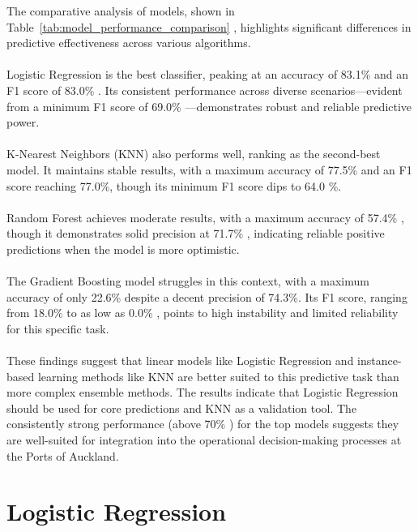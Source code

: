 			The comparative analysis of models, shown in Table~\ref{tab:model_performance_comparison}
			, highlights significant differences in predictive effectiveness across various algorithms.
			\\
			\\
			Logistic Regression is the best classifier, peaking at an accuracy of 83.1\% and an F1 score of 83.0\%
			. Its consistent performance across diverse scenarios—evident from a minimum F1 score of 69.0\%
			—demonstrates robust and reliable predictive power.
			\\
			\\
			K-Nearest Neighbors (KNN) also performs well, ranking as the second-best model. It maintains stable
			results,
			with a maximum accuracy of 77.5\% and an F1 score reaching 77.0\%, though its minimum F1 score dips to 64.0
			\%.
			\\
			\\
			Random Forest achieves moderate results, with a maximum accuracy of 57.4\%
			, though it demonstrates solid precision at 71.7\%
			, indicating reliable positive predictions when the model is more optimistic.
			\\
			\\
			The Gradient Boosting model struggles in this context, with a maximum accuracy of only 22.6\%
			despite a decent precision of 74.3\%. Its F1 score, ranging from 18.0\% to as low as 0.0\%
			, points to high instability and limited reliability for this specific task.
			\\
			\\
			These findings suggest that linear models like Logistic Regression and instance-based learning methods like
			KNN are better suited to this predictive task than more complex ensemble methods. The results indicate that
			Logistic Regression should be used for core predictions and KNN as a validation tool.
			The consistently strong performance (above 70\%
			) for the top models suggests they are well-suited for integration into the operational
			decision-making processes at the Ports of Auckland.


	\section{Logistic Regression}


